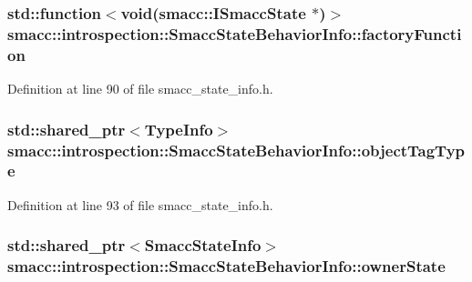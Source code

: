 \subsubsection[{\texorpdfstring{factory\+Function}{factoryFunction}}]{\setlength{\rightskip}{0pt plus 5cm}std\+::function$<$void({\bf smacc\+::\+I\+Smacc\+State} $\ast$)$>$ smacc\+::introspection\+::\+Smacc\+State\+Behavior\+Info\+::factory\+Function}\hypertarget{structsmacc_1_1introspection_1_1SmaccStateBehaviorInfo_a966cf5a5fe5cbe839be792b04e6c7368}{}\label{structsmacc_1_1introspection_1_1SmaccStateBehaviorInfo_a966cf5a5fe5cbe839be792b04e6c7368}


Definition at line 90 of file smacc\+\_\+state\+\_\+info.\+h.

\subsubsection[{\texorpdfstring{object\+Tag\+Type}{objectTagType}}]{\setlength{\rightskip}{0pt plus 5cm}std\+::shared\+\_\+ptr$<${\bf Type\+Info}$>$ smacc\+::introspection\+::\+Smacc\+State\+Behavior\+Info\+::object\+Tag\+Type}\hypertarget{structsmacc_1_1introspection_1_1SmaccStateBehaviorInfo_ae853ad3a28609fd83aa3d395d2e4c163}{}\label{structsmacc_1_1introspection_1_1SmaccStateBehaviorInfo_ae853ad3a28609fd83aa3d395d2e4c163}


Definition at line 93 of file smacc\+\_\+state\+\_\+info.\+h.

\subsubsection[{\texorpdfstring{owner\+State}{ownerState}}]{\setlength{\rightskip}{0pt plus 5cm}std\+::shared\+\_\+ptr$<${\bf Smacc\+State\+Info}$>$ smacc\+::introspection\+::\+Smacc\+State\+Behavior\+Info\+::owner\+State}\hypertarget{structsmacc_1_1introspection_1_1SmaccStateBehaviorInfo_a3a8978a085abb4e649ac4d3a13bd8257}{}\label{structsmacc_1_1introspection_1_1SmaccStateBehaviorInfo_a3a8978a085abb4e649ac4d3a13bd8257}


